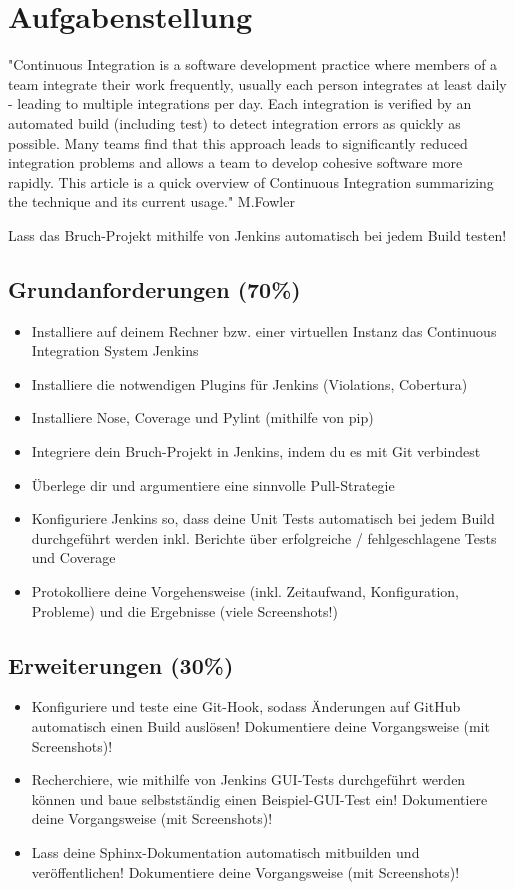 
\section{Aufgabenstellung}
"Continuous Integration is a software development practice where members of a team integrate their work frequently, usually each person integrates at least daily - leading to multiple integrations per day. Each integration is verified by an automated build (including test) to detect integration errors as quickly as possible. Many teams find that this approach leads to significantly reduced integration problems and allows a team to develop cohesive software more rapidly. This article is a quick overview of Continuous Integration summarizing the technique and its current usage." M.Fowler

Lass das Bruch-Projekt mithilfe von Jenkins automatisch bei jedem Build testen!

\subsection{Grundanforderungen (70\%)}
\begin{itemize}
	\item Installiere auf deinem Rechner bzw. einer virtuellen Instanz das Continuous Integration System Jenkins
	\item Installiere die notwendigen Plugins für Jenkins (Violations, Cobertura)
	\item Installiere Nose, Coverage und Pylint (mithilfe von pip)
	\item Integriere dein Bruch-Projekt in Jenkins, indem du es mit Git verbindest
	\item Überlege dir und argumentiere eine sinnvolle Pull-Strategie
	\item Konfiguriere Jenkins so, dass deine Unit Tests automatisch bei jedem Build durchgeführt werden inkl. Berichte über erfolgreiche / fehlgeschlagene Tests und Coverage
	\item Protokolliere deine Vorgehensweise (inkl. Zeitaufwand, Konfiguration, Probleme) und die Ergebnisse (viele Screenshots!)
\end{itemize}

\subsection{Erweiterungen (30\%)}

\begin{itemize}
	\item Konfiguriere und teste eine Git-Hook, sodass Änderungen auf GitHub automatisch einen Build auslösen! Dokumentiere deine Vorgangsweise (mit Screenshots)!
	\item Recherchiere, wie mithilfe von Jenkins GUI-Tests durchgeführt werden können und baue selbstständig einen Beispiel-GUI-Test ein! Dokumentiere deine Vorgangsweise (mit Screenshots)!
	\item 
	Lass deine Sphinx-Dokumentation automatisch mitbuilden und veröffentlichen! Dokumentiere deine Vorgangsweise (mit Screenshots)!
\end{itemize}

\clearpage
